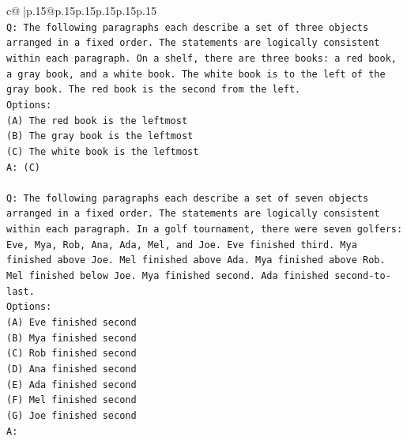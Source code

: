 \documentclass{article}
\begin{document}
{\begin{supertabular}{c@{$\;$}|p{.15\linewidth}@{}p{.15\linewidth}p{.15\linewidth}p{.15\linewidth}p{.15\linewidth}p{.15\linewidth}}
{{{\\ 
\texttt{Q: The following paragraphs each describe a set of three objects arranged in a fixed order. The statements are logically consistent within each paragraph. On a shelf, there are three books: a red book, a gray book, and a white book. The white book is to the left of the gray book. The red book is the second from the left.} \\
\texttt{Options:} \\
\texttt{(A) The red book is the leftmost} \\
\texttt{(B) The gray book is the leftmost} \\
\texttt{(C) The white book is the leftmost} \\
\texttt{A: (C)} \\
\\ 
\texttt{Q: The following paragraphs each describe a set of seven objects arranged in a fixed order. The statements are logically consistent within each paragraph. In a golf tournament, there were seven golfers: Eve, Mya, Rob, Ana, Ada, Mel, and Joe. Eve finished third. Mya finished above Joe. Mel finished above Ada. Mya finished above Rob. Mel finished below Joe. Mya finished second. Ada finished second{-}to{-}last.} \\
\texttt{Options:} \\
\texttt{(A) Eve finished second} \\
\texttt{(B) Mya finished second} \\
\texttt{(C) Rob finished second} \\
\texttt{(D) Ana finished second} \\
\texttt{(E) Ada finished second} \\
\texttt{(F) Mel finished second} \\
\texttt{(G) Joe finished second} \\
\texttt{A:} \\
            }
        }
    }
     \\ \\


\end{supertabular}}
\end{document}
